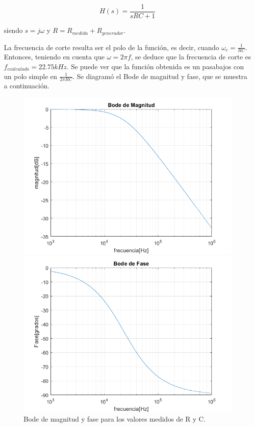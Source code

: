 \begin{center}
\begin{equation}
\label{transf}
H(s)=\frac{1}{sRC+1}
\end{equation}
\end{center}

siendo $s=j\omega$ y $R=R_{medida} + R_{generador}$.

La frecuencia de corte resulta ser el polo de la función, es decir, cuando 
$\omega_c=\frac{1}{RC}$. Entonces, teniendo en cuenta que $\omega=2\pi f$, se deduce que la frecuencia de corte es $f_{ccalculado}=22.75kHz$. 
Se puede ver que la función obtenida es un pasabajos con un polo simple en $\frac{1}{2\pi RC}$.
Se diagramó el Bode de magnitud y fase, que se muestra a continuación.

\begin{figure}[H]
\centering
\begin{minipage}{.5\textwidth}
\includegraphics[scale=0.45]{1-3a.png}
\end{minipage}%
\begin{minipage}{.5\textwidth}
\includegraphics[scale=0.45]{1-3b.png}
\end{minipage}
\caption{Bode de magnitud y fase para los valores medidos de R y C.}
\label{diagbodemedido}
\end{figure}


